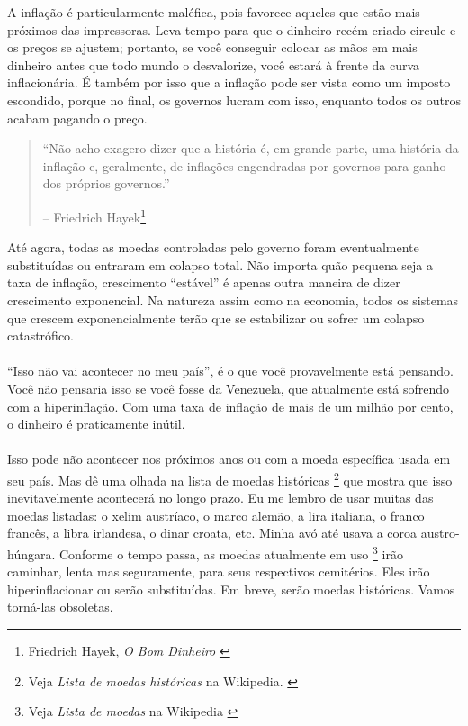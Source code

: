 A inflação é particularmente maléfica, pois favorece aqueles que estão mais próximos das impressoras. Leva tempo para que o dinheiro recém-criado circule e os preços se ajustem; portanto, se você conseguir colocar as mãos em mais dinheiro antes que todo mundo o desvalorize, você estará à frente da curva inflacionária. É também por isso que a inflação pode ser vista como um imposto escondido, porque no final, os governos lucram com isso, enquanto todos os outros acabam pagando o preço.

\begin{quotation}\begin{samepage}
\enquote{Não acho exagero dizer que a história é, em grande parte, uma história da inflação e, geralmente, de inflações engendradas por governos para ganho dos próprios governos.}
\begin{flushright} -- Friedrich Hayek\footnote{Friedrich Hayek, \textit{O Bom Dinheiro} \cite{hayek-good-money}}
\end{flushright}\end{samepage}\end{quotation}

Até agora, todas as moedas controladas pelo governo foram eventualmente substituídas ou entraram em colapso total. Não importa quão pequena seja a taxa de inflação, crescimento \enquote{estável} é apenas outra maneira de dizer crescimento exponencial. Na natureza assim como na economia, todos os sistemas que crescem exponencialmente terão que se estabilizar ou sofrer um colapso catastrófico.

\paragraph{}
\enquote{Isso não vai acontecer no meu país}, é o que você provavelmente está pensando. Você não pensaria isso se você fosse da Venezuela, que atualmente está sofrendo com a hiperinflação. Com uma taxa de inflação de mais de um milhão por cento, o dinheiro é praticamente inútil. \cite{wiki:venezuela}

\paragraph{}
Isso pode não acontecer nos próximos anos ou com a moeda específica usada em seu país. Mas dê uma olhada na lista de moedas históricas \footnote{Veja \textit{Lista de moedas históricas} na Wikipedia. \cite{wiki:historical-currencies}} que mostra que isso inevitavelmente acontecerá no longo prazo. Eu me lembro de usar muitas das moedas listadas: o xelim austríaco, o marco alemão, a lira italiana, o franco francês, a libra irlandesa, o dinar croata, etc. Minha avó até usava a coroa austro-húngara. Conforme o tempo passa, as moedas atualmente em uso \footnote{Veja \textit{Lista de moedas} na Wikipedia \cite{wiki:list-of-currencies}} irão caminhar, lenta mas seguramente, para seus respectivos cemitérios. Eles irão hiperinflacionar ou serão substituídas. Em breve, serão moedas históricas. Vamos torná-las obsoletas.

